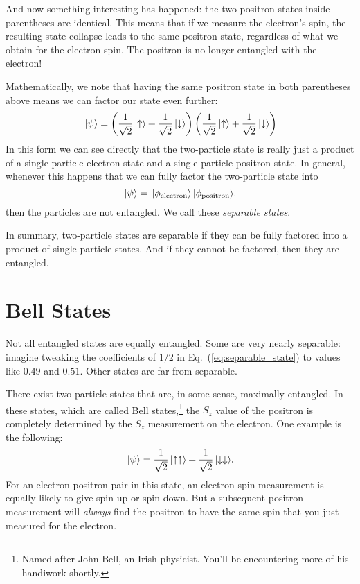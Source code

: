 And now something interesting has happened: the two positron states
inside parentheses are identical.  This means that if we measure the
electron's spin, the resulting state collapse leads to the same
positron state, regardless of what we obtain for the electron spin.
The positron is no longer entangled with the electron!

Mathematically, we note that having the same positron state in both
parentheses above means we can factor our state even further:
\begin{equation}
\,|\mbox{$\psi$}\rangle = 
\left(\frac{1}{\sqrt{2}}\,|\mbox{$\uparrow$}\rangle +\frac{1}{\sqrt{2}}\,|\mbox{$\downarrow$}\rangle
 \right)
\left(\frac{1}{\sqrt{2}}\,|\mbox{$\uparrow$}\rangle +\frac{1}{\sqrt{2}}\,|\mbox{$\downarrow$}\rangle
 \right)
\end{equation}
In this form we can see directly that the two-particle state is really
just a product of a single-particle electron state and a single-particle
positron state.  In general, whenever this happens that we can
fully factor the two-particle state into
\begin{equation}
\,|\mbox{$\psi$}\rangle = \,|\mbox{$\phi_\text{electron}$}\rangle\,|\mbox{$\phi_\text{positron}$}\rangle .
\end{equation}
then the particles are not entangled.  We call these
\textit{separable states}.

In summary, two-particle states are separable if they can be fully
factored into a product of single-particle states.  And if they cannot
be factored, then they are entangled.

\section{Bell States}

Not all entangled states are equally entangled.  Some are very nearly
separable: imagine tweaking the coefficients of 1/2 in
Eq.~(\ref{eq:separable_state}) to values like $0.49$ and $0.51$.
Other states are far from separable.

There exist two-particle states that are, in some sense, maximally
entangled.  In these states, which are called Bell
states,\footnote{Named after John Bell, an Irish physicist.  You'll be
  encountering more of his handiwork shortly.}  the $S_z$
value of the positron is completely determined by the $S_z$
measurement on the electron.  One example is the following:
\begin{equation}
  \,|\mbox{$\psi$}\rangle = \frac{1}{\sqrt{2}}\,|\mbox{$\uparrow\uparrow$}\rangle
 + \frac{1}{\sqrt{2}}\,|\mbox{$\downarrow\downarrow$}\rangle .
\label{eq:bell_state_example}
\end{equation}
For an electron-positron pair in this state, an electron spin measurement
is equally likely to give spin up or spin down.  But a subsequent
positron measurement will \textit{always} find the positron to have the same
spin that you just measured for the electron.

